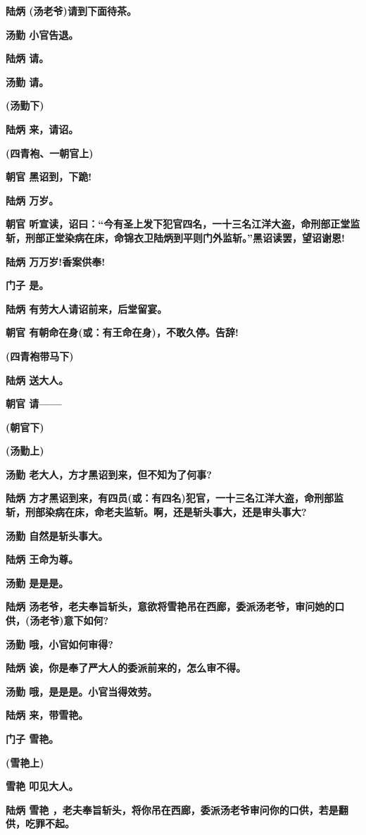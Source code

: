 \textbf{陆炳 (汤老爷)请到下面待茶。}

\textbf{汤勤 小官告退。}

\textbf{陆炳 请。}

\textbf{汤勤 请。}

\textbf{(汤勤下)}

\textbf{陆炳 来，请诏。}

\textbf{(四青袍、一朝官上)}

\textbf{朝官 黑诏到，下跪!}

\textbf{陆炳 万岁。}

\textbf{朝官
听宣读，诏曰：``今有圣上发下犯官四名，一十三名江洋大盗，命刑部正堂监斩，刑部正堂染病在床，命锦衣卫陆炳到平则门外监斩。''黑诏读罢，望诏谢恩!}

\textbf{陆炳 万万岁!香案供奉!}

\textbf{门子 是。}

\textbf{陆炳 有劳大人请诏前来，后堂留宴。}

\textbf{朝官 有朝命在身(或：有王命在身)，不敢久停。告辞!}

\textbf{(四青袍带马下)}

\textbf{陆炳 送大人。}

\textbf{朝官 请------}

\textbf{(朝官下)}

\textbf{(汤勤上)}

\textbf{汤勤 老大人，方才黑诏到来，但不知为了何事?}

\textbf{陆炳
方才黑诏到来，有四员(或：有四名)犯官，一十三名江洋大盗，命刑部监斩，刑部染病在床，命老夫监斩。啊，还是斩头事大，还是审头事大?}

\textbf{汤勤 自然是斩头事大。}

\textbf{陆炳 王命为尊。}

\textbf{汤勤 是是是。}

\textbf{陆炳
汤老爷，老夫奉旨斩头，意欲将雪艳吊在西廊，委派汤老爷，审问她的口供，(汤老爷)意下如何?}

\textbf{汤勤 哦，小官如何审得?}

\textbf{陆炳 诶，你是奉了严大人的委派前来的，怎么审不得。}

\textbf{汤勤 哦，是是是。小官当得效劳。}

\textbf{陆炳 来，带雪艳。}

\textbf{门子 雪艳。}

\textbf{(雪艳上)}

\textbf{雪艳 叩见大人。}

\textbf{陆炳 雪艳
，老夫奉旨斩头，将你吊在西廊，委派汤老爷审问你的口供，若是翻供，吃罪不起。}

